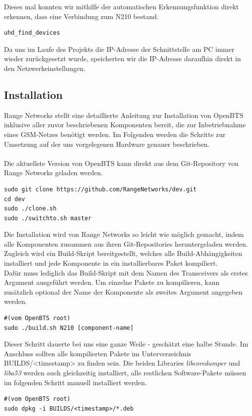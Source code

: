 Dieses mal konnten wir mithilfe der automatischen Erkennungsfunktion direkt erkennen, dass eine Verbindung zum N210 bestand.
\begin{lstlisting}
uhd_find_devices
\end{lstlisting}

Da uns im Laufe des Projekts die IP-Adresse der Schnittstelle am PC immer wieder zurückgesetzt wurde, speicherten wir die IP-Adresse daraufhin direkt in den Netzwerkeinstellungen.

\subsection{Installation}
Range Networks stellt eine detaillierte Anleitung zur Installation von OpenBTS inklusive aller zuvor beschriebenen Komponenten bereit, die zur Inbetriebnahme eines GSM-Netzes benötigt werden. Im Folgenden werden die Schritte zur Umsetzung auf der uns vorgelegenen Hardware genauer beschrieben.\\
\\
Die aktuellste Version von OpenBTS kann direkt aus dem Git-Repository von Range Networks geladen werden.
\begin{lstlisting}
sudo git clone https://github.com/RangeNetworks/dev.git
cd dev
sudo ./clone.sh
sudo ./switchto.sh master
\end{lstlisting}

Die Installation wird von Range Networks so leicht wie möglich gemacht, indem alle Komponenten zusammen aus ihren Git-Repositories heruntergeladen werden. Zugleich wird ein Build-Skript bereitgestellt, welches alle Build-Abhängigkeiten installiert und jede Komponente in ein installierbares Paket kompiliert.\\
Dafür muss lediglich das Build-Skript mit dem Namen des Transceivers als erstes Argument ausgeführt werden. Um einzelne Pakete zu kompilieren, kann zusätzlich optional der Name der Komponente als zweites Argument angegeben werden.
\begin{lstlisting}
#(vom OpenBTS root)
sudo ./build.sh N210 [component-name]
\end{lstlisting}

Dieser Schritt dauerte bei uns eine ganze Weile - geschätzt eine halbe Stunde. Im Anschluss sollten alle kompilierten Pakete im Unterverzeichnis BUILDS/<timestamp> zu finden sein. Die beiden Libraries \textit{libcoredumper} und \textit{liba53} werden auch gleichzeitig installiert, alle restlichen Software-Pakete müssen im folgenden Schritt manuell installiert werden.
\begin{lstlisting}
#(vom OpenBTS root)
sudo dpkg -i BUILDS/<timestamp>/*.deb
\end{lstlisting}

